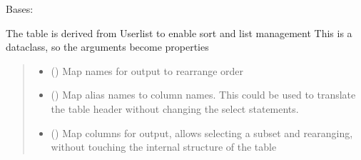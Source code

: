 \documentclass[letterpaper,10pt,english]{sphinxmanual}
\begin{document}
\begin{savenotes}\begin{fulllineitems}
\label{\detokenize{eezz:eezz.table.TTable}}
\pysigstartsignatures
{}
\pysigstopsignatures
\sphinxAtStartPar
Bases: 

\sphinxAtStartPar
The table is derived from User\sphinxhyphen{}list to enable sort and list management
This is a dataclass, so the arguments become properties

\label{\detokenize{eezz:ttable-parameter-list}}\begin{quote}\begin{description}
\begin{itemize}
\item {} 
\sphinxAtStartPar
{} (\sphinxstyleliteralemphasis{\sphinxupquote{{[}}}\sphinxstyleliteralemphasis{\sphinxupquote{{]}}}) \textendash{} Map names for output to re\sphinxhyphen{}arrange order

\item {} 
\sphinxAtStartPar
{} (\sphinxstyleliteralemphasis{\sphinxupquote{{[}}}\sphinxstyleliteralemphasis{\sphinxupquote{, }}\sphinxstyleliteralemphasis{\sphinxupquote{{]}}}) \textendash{} Map alias names to column names. This could be used to translate the table header    without changing the select statements.

\item {} 
\sphinxAtStartPar
{} (\sphinxstyleliteralemphasis{\sphinxupquote{{[}}}\sphinxstyleliteralemphasis{\sphinxupquote{{]}}}) \textendash{} Map columns for output, allows selecting a subset and rearanging, without touching    the internal structure of the table


\end{itemize}
\end{description}
\end{quote}
\end{fulllineitems}
\end{savenotes}
\end{document}
